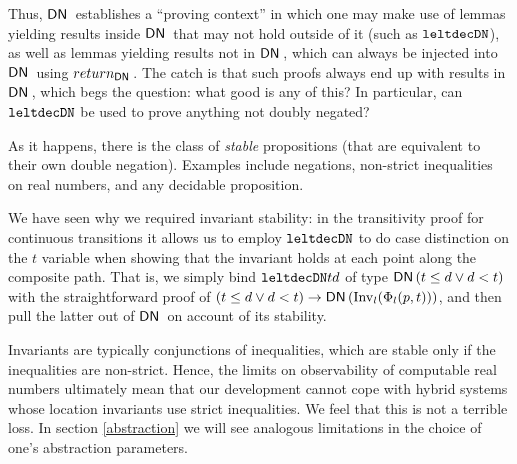 \documentclass[runningheads]{llncs}
\newcommand{\DN}{{\sf DN}\,}
\newcommand{\State}{{\rm State}}
\newcommand{\Inv}{{\rm Inv}}
\newcommand{\Unsafe}{{\rm Unsafe}}
\newcommand{\Reach}{{\rm Reach}}
\newcommand{\leltdecDN}{{\tt leltdecDN}}
\begin{document}
Thus, $\DN$ establishes a ``proving context'' in which one may make
use of lemmas yielding results inside $\DN$ that may not hold outside
of it (such as $\leltdecDN$), as well as lemmas yielding results
not in $\DN$, which can always be injected into $\DN$ using
$return_{\DN}$. The catch is that such proofs always end up with results
in $\DN$, which begs the question: what good is any of this? In
particular, can $\leltdecDN$ be used to prove anything not doubly
negated?
 
As it happens, there is the class of \emph{stable} propositions (that
are equivalent to their own double negation). Examples include
negations, non-strict inequalities on real numbers, and any decidable
proposition.
 
We have seen why we required invariant stability:
in the transitivity proof for continuous transitions
it allows
us to employ $\leltdecDN$ to do case distinction on the $t$ variable
when showing that the invariant holds at each point along the
composite path. That is, we simply bind $\leltdecDN t d$ of type
$\DN (t \leq d \vee d < t)$ with the straightforward proof of $(t \leq d
\vee d < t) \rightarrow \DN (\Inv_l(\Phi_l (p, t)))$, and
then pull the latter out of $\DN$ on account of its stability.
 
Invariants are typically conjunctions of inequalities, which are
stable only if the inequalities are non-strict. Hence, the limits on
observability of computable real numbers ultimately mean that our
development cannot cope with hybrid systems whose location invariants
use strict inequalities. We feel that this is not a terrible loss. In
section \ref{abstraction} we will see analogous limitations in the
choice of one's abstraction parameters.
 
\end{document}
